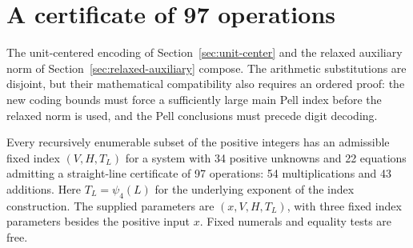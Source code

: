\section{A certificate of 97 operations}\label{sec:composed-97}

The unit-centered encoding of Section~\ref{sec:unit-center} and the
relaxed auxiliary norm of Section~\ref{sec:relaxed-auxiliary} compose.
The arithmetic substitutions are disjoint, but their mathematical
compatibility also requires an ordered proof: the new coding bounds
must force a sufficiently large main Pell index before the relaxed
norm is used, and the Pell conclusions must precede digit decoding.

\begin{theorem}\label{thm:best97}
Every recursively enumerable subset of the positive integers has an
admissible fixed index $(V,H,T_L)$ for a system with 34 positive
unknowns and 22 equations admitting a straight-line certificate of
97 operations: 54 multiplications and 43 additions. Here
$T_L=\psi_4(L)$ for the underlying exponent of the index construction.
The supplied parameters are $(x,V,H,T_L)$, with three fixed index
parameters besides the positive input $x$. Fixed numerals and
equality tests are free.
\end{theorem}

